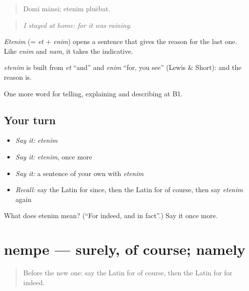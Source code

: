 \begin{quote}
Domī mānsī; etenim pluēbat.
\end{quote}

\begin{quote}
\emph{I stayed at home: for it was raining.}
\end{quote}

\emph{Etenim} (= \emph{et} + \emph{enim}) opens a sentence that gives the reason for the last one. Like \emph{enim} and \emph{nam}, it takes the indicative.

\begin{cousinweb}
\emph{etenim} is built from \emph{et} \textquotedblleft{}and\textquotedblright{} and \emph{enim} \textquotedblleft{}for, you see\textquotedblright{} (Lewis \& Short): and the reason is.
\end{cousinweb}

\begin{grammarlens}[title={What you've built}]
One more word for telling, explaining and describing at B1.
\end{grammarlens}

\subsection*{Your turn}
\begin{itemize}
\raggedright
  \item \emph{Say it:} \emph{etenim}
  \item \emph{Say it:} \emph{etenim}, once more
  \item \emph{Say it:} a sentence of your own with \emph{etenim}
  \item \emph{Recall:} say the Latin for since, then the Latin for of course, then say \emph{etenim} again
\end{itemize}

\begin{tcolorbox}[breakable,colback=teal!4,colframe=teal!35!black,title={Before you move on}]
What does etenim mean? (\textquotedblleft{}For indeed, and in fact\textquotedblright{}.) Say it once more.
\end{tcolorbox}
\section[nempe]{nempe — surely, of course; namely}

\label{lesson:LA-C365-nempe}



\begin{quote}
Before the new one: say the Latin for of course, then the Latin for for indeed.
\end{quote}


